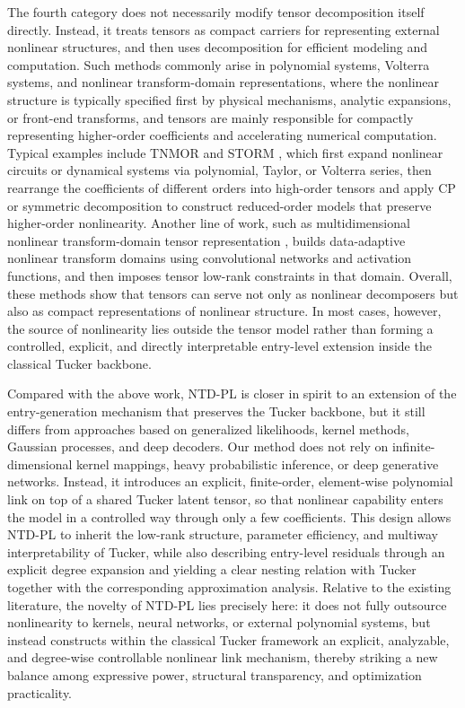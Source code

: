 The fourth category does not necessarily modify tensor decomposition itself directly. Instead, it treats tensors as compact carriers for representing external nonlinear structures, and then uses decomposition for efficient modeling and computation. Such methods commonly arise in polynomial systems, Volterra systems, and nonlinear transform-domain representations, where the nonlinear structure is typically specified first by physical mechanisms, analytic expansions, or front-end transforms, and tensors are mainly responsible for compactly representing higher-order coefficients and accelerating numerical computation. Typical examples include TNMOR and STORM \cite{liu2015model,deng2016storm}, which first expand nonlinear circuits or dynamical systems via polynomial, Taylor, or Volterra series, then rearrange the coefficients of different orders into high-order tensors and apply CP or symmetric decomposition to construct reduced-order models that preserve higher-order nonlinearity. Another line of work, such as multidimensional nonlinear transform-domain tensor representation \cite{shi2025multidimensional}, builds data-adaptive nonlinear transform domains using convolutional networks and activation functions, and then imposes tensor low-rank constraints in that domain. Overall, these methods show that tensors can serve not only as nonlinear decomposers but also as compact representations of nonlinear structure. In most cases, however, the source of nonlinearity lies outside the tensor model rather than forming a controlled, explicit, and directly interpretable entry-level extension inside the classical Tucker backbone.

Compared with the above work, NTD-PL is closer in spirit to an extension of the entry-generation mechanism that preserves the Tucker backbone, but it still differs from approaches based on generalized likelihoods, kernel methods, Gaussian processes, and deep decoders. Our method does not rely on infinite-dimensional kernel mappings, heavy probabilistic inference, or deep generative networks. Instead, it introduces an explicit, finite-order, element-wise polynomial link on top of a shared Tucker latent tensor, so that nonlinear capability enters the model in a controlled way through only a few coefficients. This design allows NTD-PL to inherit the low-rank structure, parameter efficiency, and multiway interpretability of Tucker, while also describing entry-level residuals through an explicit degree expansion and yielding a clear nesting relation with Tucker together with the corresponding approximation analysis. Relative to the existing literature, the novelty of NTD-PL lies precisely here: it does not fully outsource nonlinearity to kernels, neural networks, or external polynomial systems, but instead constructs within the classical Tucker framework an explicit, analyzable, and degree-wise controllable nonlinear link mechanism, thereby striking a new balance among expressive power, structural transparency, and optimization practicality.
